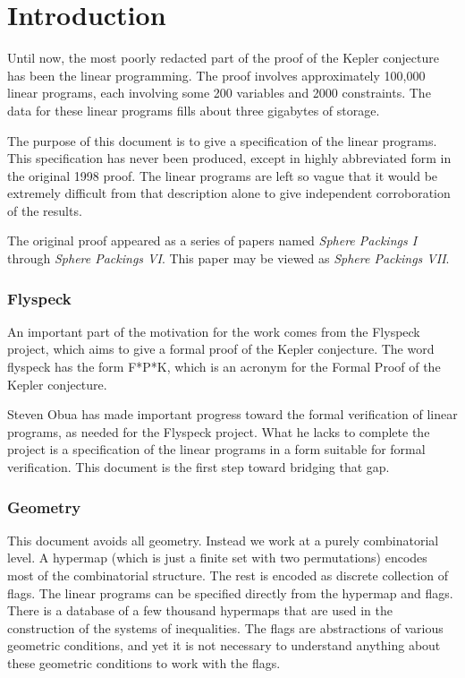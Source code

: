 


\section{Introduction}

Until now, the most poorly redacted part of the proof of the
Kepler conjecture has been the linear programming.  The proof
involves approximately 100,000 linear programs, each involving
some 200 variables and 2000 constraints.  The data for these
linear programs fills about three gigabytes of storage.

The purpose of this document is to give a specification of the
linear programs. This specification has never been produced,
except in highly abbreviated form in the original 1998 proof. The
linear programs are left so vague that it would be extremely
difficult from that description alone to give independent
corroboration of the results.

The original proof appeared as a series of papers named {\it
Sphere Packings I} through {\it Sphere Packings VI}.  This paper
may be viewed as {\it Sphere Packings VII}.

\subsubsection{Flyspeck}

An important part of the motivation for the work comes from the
Flyspeck project, which aims to give a formal proof of the Kepler
conjecture.  The word flyspeck has the form F*P*K, which is an
acronym for the Formal Proof of the Kepler conjecture.

Steven Obua has made important progress toward the formal
verification of linear programs, as needed for the Flyspeck
project.  What he lacks to complete the project is a specification
of the linear programs in a form suitable for formal verification.
This document is the first step toward bridging that gap.

\subsubsection{Geometry}

This document avoids all geometry.  Instead we work at a purely
combinatorial level.    A hypermap (which is just a finite set
with two permutations) encodes most of the combinatorial
structure.  The rest is encoded as discrete collection of flags.
The linear programs can be specified directly from the hypermap
and flags.  There is a database of a few thousand hypermaps that
are used in the construction of the systems of inequalities.  The
flags are abstractions of various geometric conditions, and yet
it is not necessary to understand anything about these geometric
conditions to work with the flags.

